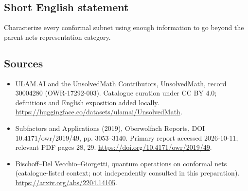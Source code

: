 \documentclass[11pt]{article}
\begin{document}
\subsection{Short English statement}
Characterize every conformal subnet using enough information to go beyond the parent net\textquotesingle s representation category.
\subsection{Sources}
\begin{itemize}
\item[\hypertarget{source:30004280:1}{S1}] ULAM.AI and the UnsolvedMath Contributors, UnsolvedMath, record 30004280 (OWR-17292-003). Catalogue curation under CC BY 4.0; definitions and English exposition added locally.
\url{https://huggingface.co/datasets/ulamai/UnsolvedMath}.
\item[\hypertarget{source:30004280:2}{S2}] Subfactors and Applications (2019), Oberwolfach Reports, DOI 10.4171/owr/2019/49, pp. 3053--3140. Primary report accessed 2026-10-11; relevant PDF pages 28, 29.
\url{https://doi.org/10.4171/owr/2019/49}.
\item[\hypertarget{source:30004280:3}{S3}] Bischoff--Del Vecchio--Giorgetti, quantum operations on conformal nets (catalogue-listed context; not independently consulted in this preparation).
\url{https://arxiv.org/abs/2204.14105}.
\end{itemize}
\label{end:30004280}
\end{document}
